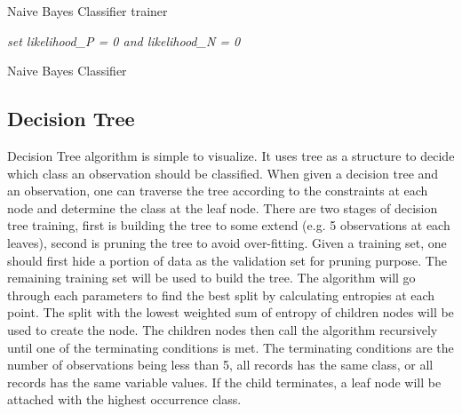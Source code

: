 \documentclass[twoside]{article}
\begin{document}
\IncMargin{1em}
\begin{algorithm}
\BlankLine
{}
\caption{Naive Bayes Classifier trainer}\label{NBCt}
\end{algorithm}\DecMargin{1em}

\IncMargin{1em}
\begin{algorithm}
\BlankLine
\emph{set likelihood\_P = 0 and likelihood\_N = 0}\;
\caption{Naive Bayes Classifier}\label{NBC}
\end{algorithm}\DecMargin{1em}


\subsection{Decision Tree}
Decision Tree algorithm is simple to visualize. It uses tree as a structure to decide which class an observation should be classified. When given a decision tree and an observation, one can traverse the tree according to the constraints at each node and determine the class at the leaf node. There are two stages of decision tree training, first is building the tree to some extend (e.g. 5 observations at each leaves), second is pruning the tree to avoid over-fitting. Given a training set, one should first hide a portion of data as the validation set for pruning purpose. The remaining training set will be used to build the tree. The algorithm will go through each parameters to find the best split by calculating entropies at each point. The split with the lowest weighted sum of entropy of children nodes will be used to create the node. The children nodes then call the algorithm recursively until one of the terminating conditions is met. The terminating conditions are the number of observations being less than 5, all records has the same class, or all records has the same variable values. If the child terminates, a leaf node will be attached with the highest occurrence class.
\end{document}
